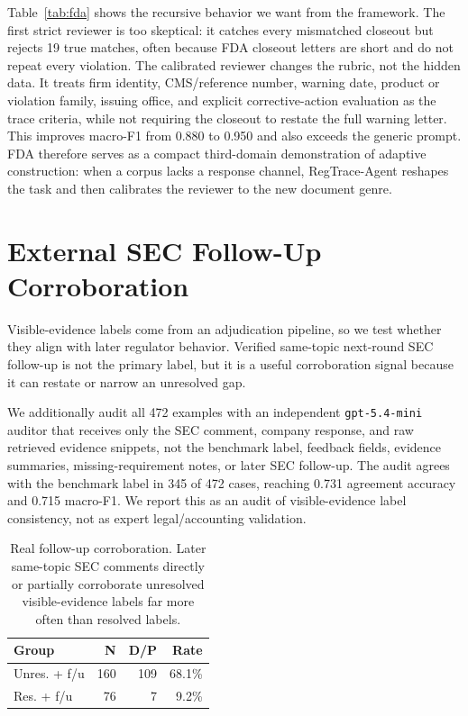 \documentclass[11pt]{article}
\newcommand{\framework}{RegTrace-Agent}
\begin{document}
Table~\ref{tab:fda} shows the recursive behavior we want from the framework. The first strict reviewer is too skeptical: it catches every mismatched closeout but rejects 19 true matches, often because FDA closeout letters are short and do not repeat every violation. The calibrated reviewer changes the rubric, not the hidden data. It treats firm identity, CMS/reference number, warning date, product or violation family, issuing office, and explicit corrective-action evaluation as the trace criteria, while not requiring the closeout to restate the full warning letter. This improves macro-F1 from 0.880 to 0.950 and also exceeds the generic prompt. FDA therefore serves as a compact third-domain demonstration of adaptive construction: when a corpus lacks a response channel, \framework{} reshapes the task and then calibrates the reviewer to the new document genre.

\section{External SEC Follow-Up Corroboration}

Visible-evidence labels come from an adjudication pipeline, so we test whether they align with later regulator behavior. Verified same-topic next-round SEC follow-up is not the primary label, but it is a useful corroboration signal because it can restate or narrow an unresolved gap.

We additionally audit all 472 examples with an independent \texttt{gpt-5.4-mini} auditor that receives only the SEC comment, company response, and raw retrieved evidence snippets, not the benchmark label, feedback fields, evidence summaries, missing-requirement notes, or later SEC follow-up. The audit agrees with the benchmark label in 345 of 472 cases, reaching 0.731 agreement accuracy and 0.715 macro-F1. We report this as an audit of visible-evidence label consistency, not as expert legal/accounting validation.

\begin{table}[t]
\centering
\scriptsize
\setlength{\tabcolsep}{2pt}
\begin{tabular}{lrrr}
\toprule
\textbf{Group} & \textbf{N} & \textbf{D/P} & \textbf{Rate} \\
\midrule
Unres. + f/u & 160 & 109 & 68.1\% \\
Res. + f/u & 76 & 7 & 9.2\% \\
\bottomrule
\end{tabular}
\caption{Real follow-up corroboration. Later same-topic SEC comments directly or partially corroborate unresolved visible-evidence labels far more often than resolved labels.}
\label{tab:followup}
\end{table}
\end{document}
